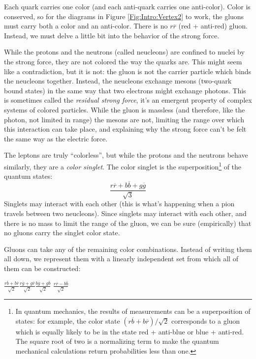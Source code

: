 Each quark carries one color (and each anti-quark carries one anti-color). Color is conserved, so for the diagrams in Figure \ref{Fig:Intro:Vertex2} to work, the gluons must carry both a color and an anti-color. There is no $r\overline{r}$ (red + anti-red) gluon. Instead, we must delve a little bit into the behavior of the strong force.

While the protons and the neutrons (called neucleons) are confined to nuclei by the strong force, they are not colored the way the quarks are. This might seem like a contradiction, but it is not: the gluon is not the carrier particle which binds the neucleons together. Instead, the neucleons exchange mesons (two-quark bound states) in the same way that two electrons might exchange photons. This is sometimes called the \textit{residual strong force}, it's an emergent property of complex systems of colored particles. While the gluon is massless (and therefore, like the photon, not limited in range) the mesons are not, limiting the range over which this interaction can take place, and explaining why the strong force can't be felt the same way as the electric force.

The leptons are truly ``colorless'', but while the protons and the neutrons behave similarly, they are a \textit{color singlet}. The color singlet is the superposition\footnote{In quantum mechanics, the results of measurements can be a superposition of states: for example, the color state $(r\overline{b} + b\overline{r})/\sqrt{2}$ corresponds to a gluon which is equally likely to be in the state red + anti-blue or blue + anti-red. The square root of two is a normalizing term to make the quantum mechanical calculations return probabilities less than one.} of the quantum states:
\begin{equation}
    \frac{r\overline{r} + b\overline{b} + g\overline{g}}{\sqrt{3}}
\end{equation}
Singlets may interact with each other (this is what's happening when a pion travels between two neucleons). Since singlets may interact with each other, and there is no mass to limit the range of the gluon, we can be sure (empirically) that no gluons carry the singlet color state.

Gluons can take any of the remaining color combinations. Instead of writing them all down, we represent them with a linearly independent set from which all of them can be constructed: 

{\centering

    $\frac{r\overline{b} + b\overline{r}}{\sqrt{2}}$\hspace{1cm}$\frac{r\overline{g} + g\overline{r}}{\sqrt{2}}$\hspace{1cm}$\frac{b\overline{g} + g\overline{b}}{\sqrt{2}}$\hspace{1cm} $\frac{r\overline{r} - b\overline{b}}{\sqrt{2}}$
    
    }


